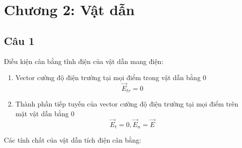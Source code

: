 \section[Chương 2]{Chương 2: Vật dẫn}

\subsection{Câu 1}

Điều kiện cân bằng tĩnh điện của vật dẫn mang điện:

\begin{enumerate}
  \item Vector cường độ điện trường tại mọi điểm trong vật dẫn bằng 0
  \begin{equation*}
    \vec{E}_{tr} = 0
  \end{equation*}
  \item Thành phần tiếp tuyến của vector cường độ điện trường tại mọi điểm trên mặt vật dẫn bằng 0
  \begin{equation*}
    \vec{E}_t = 0, \vec{E}_n = \vec{E}
  \end{equation*}
\end{enumerate}

Các tính chất của vật dẫn tích điện cân bằng:

